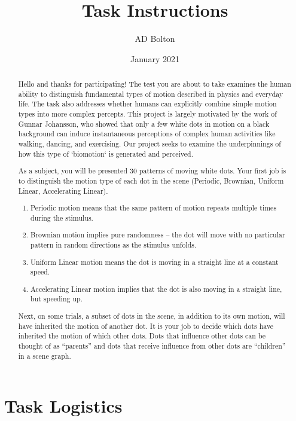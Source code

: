 \documentclass{scrartcl}
\title{Task Instructions}
\author{AD Bolton}
\date{January 2021}
\begin{document}
\maketitle

\begin{abstract}

  Hello and thanks for participating! The test you are about to take examines the human ability to distinguish fundamental types of motion described in physics and everyday life. The task also addresses whether humans can explicitly combine simple motion types into more complex percepts. This project is largely motivated by the work of Gunnar Johansson, who showed that only a few white dots in motion on a black background can induce instantaneous perceptions of complex human activities like walking, dancing, and exercising. Our project seeks to examine the underpinnings of how this type of `biomotion` is generated and perceived. 

  As a subject, you will be presented 30 patterns of moving white dots. Your first job is to distinguish the motion type of each dot in the scene (Periodic, Brownian, Uniform Linear, Accelerating Linear).

\begin{enumerate}
  \item Periodic motion means that the same pattern of motion repeats multiple times during the stimulus.
  \item Brownian motion implies pure randomness -- the dot will move with no particular pattern in random directions as the stimulus unfolds.
  \item Uniform Linear motion means the dot is moving in a straight line at a constant speed.
  \item Accelerating Linear motion implies that the dot is also moving in a straight line, but speeding up. 
\end{enumerate}

  Next, on some trials, a subset of dots in the scene, in addition to its own motion, will have inherited the motion of another dot. It is your job to decide which dots have inherited the motion of which other dots. Dots that influence other dots can be thought of as ``parents'' and dots that receive influence from other dots are ``children'' in a scene graph.

\end{abstract}

\vspace{10mm}

\section{Task Logistics}
\end{document}
